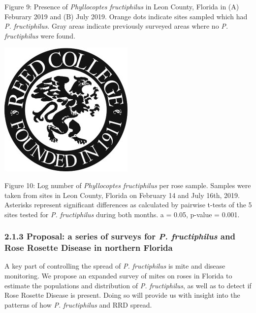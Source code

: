 \documentclass[12pt,final,CPage]{ufthesis}
\begin{document}
{  Figure 9: Presence of \emph{Phyllocoptes fructiphilus} in Leon County, Florida in (A) Feburary 2019 and (B) July 2019. Orange dots indicate sites sampled which had \emph{P. fructiphilus}. Gray areas indicate previously surveyed areas where no \emph{P. fructiphilus} were found.
  \begin{center}\includegraphics[width=0.8\linewidth]{figure/reed} \end{center}

  Figure 10: Log number of \emph{Phyllocoptes fructiphilus} per rose sample. Samples were taken from sites in Leon County, Florida on February 14 and July 16th, 2019. Asterisks represent significant differences as calculated by pairwise t-tests of the 5 sites tested for \emph{P. fructiphilus} during both months. a = 0.05, p-value = 0.001.

  \hypertarget{proposal-a-series-of-surveys-for-p.-fructiphilus-and-rose-rosette-disease-in-northern-florida}{%
  \subsubsection{\texorpdfstring{2.1.3 Proposal: a series of surveys for \emph{P. fructiphilus} and Rose Rosette Disease in northern Florida}{2.1.3 Proposal: a series of surveys for P. fructiphilus and Rose Rosette Disease in northern Florida}}\label{proposal-a-series-of-surveys-for-p.-fructiphilus-and-rose-rosette-disease-in-northern-florida}}

  A key part of controlling the spread of \emph{P. fructiphilus} is mite and disease monitoring. We propose an expanded survey of mites on roses in Florida to estimate the populations and distribution of \emph{P. fructiphilus}, as well as to detect if Rose Rosette Disease is present. Doing so will provide us with insight into the patterns of how \emph{P. fructiphilus} and RRD spread.

}
\end{document}
